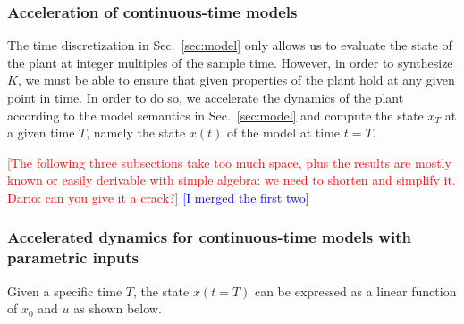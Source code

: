 \documentclass[twocolumn]{autart}    %
\newcommand{\mat}[1]{{#1}}
\renewcommand{\vec}[1]{{#1}}
\renewcommand{\note}[1]{\textcolor{red}{[#1]}}
\begin{document}
\subsubsection{Acceleration of continuous-time models}
\label{sec:continuous_time_accel}

The time discretization in Sec.~\ref{sec:model} only allows us to evaluate
the state of the plant at integer multiples of the sample time.  
However, in order to synthesize $\mat{K}$, 
we must be able to ensure that given properties of the plant hold at any given point in time.  
In order to do so, we accelerate the dynamics of the plant according to the model
semantics in Sec.~\ref{sec:model} and compute the state
$\vec{x}_T$ at a given time $T$,
%
%
namely the state $\vec{x}(t)$ of the model 
at time $t=T$. 

\textcolor{red}{[The following three subsections take too much space, plus the results are mostly known or easily derivable with simple algebra: we need to shorten and simplify it. Dario: can you give it a crack?]}
\textcolor{blue}{[I merged the first two]}

\subsubsection{Accelerated\! dynamics\! for\! continuous-time\! models\! with\! parametric\! inputs}\label{sec:real_discrete_param_inputs}
% 
Given a specific time $T$, the state $\vec{x}(t=T)$ can be expressed as a
linear function of $\vec{x}_0$ and $\vec{u}$ as shown below.  
 
\end{document}
